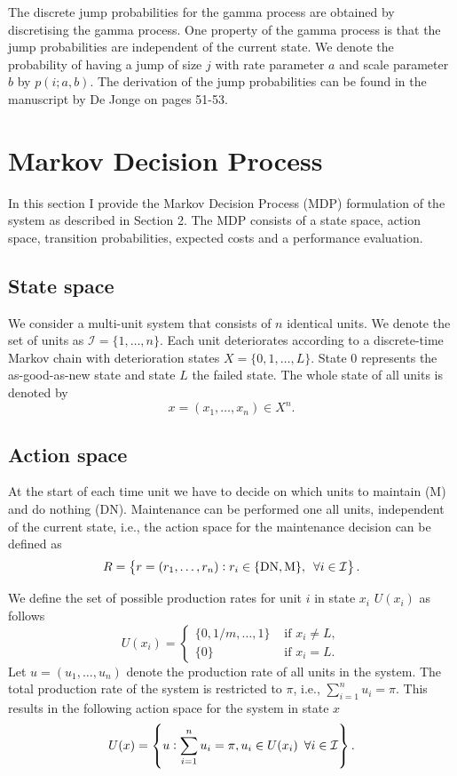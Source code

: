 \documentclass[a4paper,12pt]{article}
\begin{document}
The discrete jump probabilities for the gamma process are obtained by discretising the gamma process. One property of the gamma process is that the jump probabilities are independent of the current state. We denote the probability of having a jump of size $j$ with rate parameter $a$ and scale parameter $b$ by $p(i; a, b)$. The derivation of the jump probabilities can be found in the manuscript by De Jonge on pages 51-53.

\section{Markov Decision Process}
In this section I provide the Markov Decision Process (MDP) formulation of the system as described in Section 2. The MDP consists of a state space, action space, transition probabilities, expected costs and a performance evaluation.

\subsection{State space}
We consider a multi-unit system that consists of $n$ identical units. We denote the set of units as $\mathcal{I} = \{1, \dots, n\}$. Each unit deteriorates according to a discrete-time Markov chain with deterioration states $X = \{0, 1, \dots, L\}$. State $0$ represents the as-good-as-new state and state $L$ the failed state. The whole state of all units is denoted by
$$
x = (x_1, \dots, x_n) \in X^n.
$$

\subsection{Action space}
At the start of each time unit we have to decide on which units to maintain (M) and do nothing (DN). Maintenance can be performed one all units, independent of the current state, i.e., the action space for the maintenance decision can be defined as
$$
R = \left \{r = (r_1, \dots, r_n): r_i \in \{\text{DN}, \text{M}\}, \enskip \forall i \in \mathcal{I} \right \}.
$$

 We define the set of possible production rates for unit $i$ in state $x_i$ $U(x_i)$ as follows
$$
U(x_i) = \begin{cases}
\{0, 1/m, \dots, 1\} & \text{ if } x_i \neq L, \\
\{0\} & \text{ if } x_i = L.
\end{cases}
$$
Let $u = (u_1, \dots, u_n)$ denote the production rate of all units in the system. The total production rate of the system is restricted to $\pi$, i.e., $ \sum_{i=1}^{n}u_i = \pi$. This results in the following action space for the system in state $x$
$$
U(x) = \left\{ u  :  \sum_{i=1}^{n}u_i = \pi, u_i \in U(x_i) \enskip \forall i \in \mathcal{I} \right\}.
$$
\end{document}
